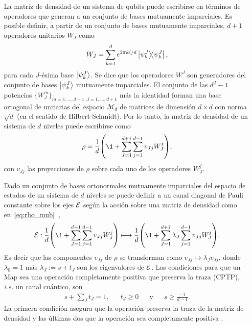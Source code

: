 La matriz de densidad de un sistema de qubits puede escribirse en términos 
de operadores que generan a un conjunto de bases mutuamente imparciales.
Es posible definir, a partir de un conjunto de bases mutuamente imparciales,
$d+1$ operadores unitarios $W_J$ como~\cite{nathanson2007pauli}
\begin{align}\label{eq:W_J}
	W_J=\sum_{k=1}^d e^{2\pi k i/d} \dyad{\psi_k^J}{\psi_k^J}, 
\end{align}
para cada $J$-ésima base $\ket{\psi_k^J}$. Se dice que los operadores 
$W^J$ son generadores del conjunto de bases $\ket{\psi_k^J}$ mutuamente 
imparciales. El conjunto de las $d^2-1$ potencias $\{W_J^m\}_{m=1,\ldots,d-1,
J=1,\ldots,d+1}$ más la identidad forman una base ortogonal
de unitarias del espacio $\mathcal{M}_d$ de matrices 
de dimensión $d\times d$ con norma $\sqrt{d}$
(en el sentido de Hilbert-Schmidt). Por lo tanto, la matriz de densidad
de un sistema de $d$ niveles puede escribirse como
\begin{align}\label{eq:rho_mub}
\rho=\frac{1}{d}\qty(\1+\sum_{J=1}^{d+1}\sum_{j=1}^{d-1} v_{Jj}W_J^j),
\end{align}
con $v_{Jj}$ las proyecciones de $\rho$ sobre cada uno de los 
operadores $W_J^j$.

Dado un conjunto de bases ortonormales mutuamente imparciales del 
espacio de estados de un sistema de $d$ niveles se
puede definir a un canal diagonal de Pauli constante sobre los ejes $\mathcal{E}$ 
según la acción sobre una matriz de densidad como 
en~\eqref{eq:rho_mub}~\cite{nathanson2007pauli},
\begin{align}\label{eq:ruskai_definition}
	\E :  \frac{1}{d}\qty(\1+\sum_{J=1}^{d+1}\sum_{j=1}^{d-1} v_{Jj}W_J^j)
	\longmapsto 
	\frac{1}{d}\qty(\1+\sum_{J=1}^{d+1}\lambda_J\sum_{j=1}^{d-1} v_{Jj}W_J^j).
\end{align}
Es decir que las componentes $v_{Jj}$ de $\rho$ se transforman como 
$v_{Jj}\mapsto\lambda_Jv_{Jj}$, donde $\lambda_0=1$ más $\lambda_J:=s+t_J$ son
los eigenvalores de $\mathcal{E}$. Las 
condiciones para que un \ruskai{}{}{}Map{} sea una operación 
completamente positiva que preserva la traza (CPTP), \textit{i.e.} un canal cuántico,
son
\begin{align}\label{eq:cptp_conditions_ruskai}
	s+\sum_{J}t_J=1, && t_J\geq0 && \text{y} && s\geq\frac{-1}{d-1}.
\end{align}
La primera condición asegura que la operación preserva la traza de la matriz 
de densidad y las últimas dos que la operación sea completamente positiva
\cite{nathanson2007pauli}.

